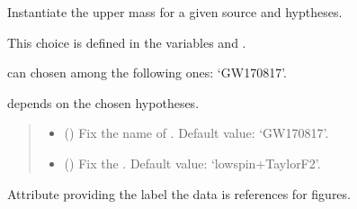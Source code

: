 \documentclass[letterpaper,10pt,english]{sphinxmanual}
\begin{document}
\begin{fulllineitems}
\label{\detokenize{source/api/setup_astro_mup:nucleardatapy.astro.setup_mup.setupMup}}
\pysigstartsignatures
{}
\pysigstopsignatures
\sphinxAtStartPar
Instantiate the upper mass for a given source and hyptheses.

\sphinxAtStartPar
This choice is defined in the variables  and .

\sphinxAtStartPar
{} can chosen among the following ones: ‘GW170817’.

\sphinxAtStartPar
{} depends on the chosen hypotheses.
\begin{quote}\begin{description}
\begin{itemize}
\item {} 
\sphinxAtStartPar
{} (\sphinxstyleliteralemphasis{\sphinxupquote{, }}) \textendash{} Fix the name of . Default value: ‘GW170817’.

\item {} 
\sphinxAtStartPar
{} (\sphinxstyleliteralemphasis{\sphinxupquote{, }}) \textendash{} Fix the . Default value: ‘low\sphinxhyphen{}spin+TaylorF2’.

\end{itemize}

\end{description}\end{quote}

\sphinxAtStartPar
{}

\begin{fulllineitems}
\label{\detokenize{source/api/setup_astro_mup:nucleardatapy.astro.setup_mup.setupMup.label}}
\pysigstartsignatures
{}
\pysigstopsignatures
\sphinxAtStartPar
Attribute providing the label the data is references for figures.


\end{fulllineitems}
\end{fulllineitems}
\end{document}

